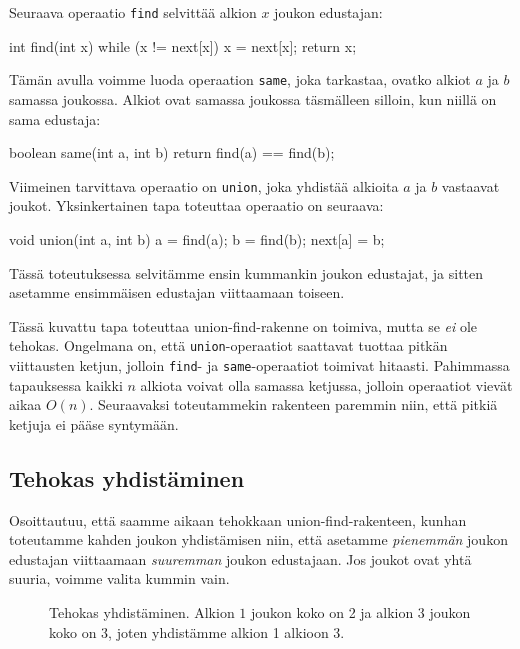 Seuraava operaatio \texttt{find} selvittää alkion $x$ joukon edustajan:

\begin{code}
int find(int x) {
    while (x != next[x]) {
        x = next[x];
    }
    return x;
}
\end{code}

Tämän avulla voimme luoda operaation \texttt{same}, joka tarkastaa,
ovatko alkiot $a$ ja $b$ samassa joukossa.
Alkiot ovat samassa joukossa täsmälleen silloin, kun niillä
on sama edustaja:

\begin{code}
boolean same(int a, int b) {
    return find(a) == find(b);
}
\end{code}

Viimeinen tarvittava operaatio on \texttt{union}, joka yhdistää alkioita
$a$ ja $b$ vastaavat joukot.
Yksinkertainen tapa toteuttaa operaatio on seuraava:

\begin{code}
void union(int a, int b) {
    a = find(a);
    b = find(b);
    next[a] = b;
}
\end{code}

Tässä toteutuksessa selvitämme ensin kummankin joukon edustajat,
ja sitten asetamme ensimmäisen edustajan viittaamaan toiseen.

Tässä kuvattu tapa toteuttaa union-find-rakenne on toimiva,
mutta se \emph{ei} ole tehokas.
Ongelmana on, että \texttt{union}-operaatiot saattavat tuottaa
pitkän viittausten ketjun, jolloin \texttt{find}- ja
\texttt{same}-operaatiot toimivat hitaasti.
Pahimmassa tapauksessa kaikki $n$ alkiota voivat olla
samassa ketjussa, jolloin operaatiot vievät aikaa $O(n)$.
Seuraavaksi toteutammekin rakenteen paremmin niin,
että pitkiä ketjuja ei pääse syntymään.

\subsection{Tehokas yhdistäminen}

Osoittautuu, että saamme aikaan tehokkaan union-find-rakenteen,
kunhan toteutamme kahden joukon yhdistämisen niin,
että asetamme \emph{pienemmän} joukon edustajan viittaamaan
\emph{suuremman} joukon edustajaan. Jos joukot ovat yhtä suuria,
voimme valita kummin vain.

\begin{figure}
\center
\begin{center}
\end{center}
\caption{Tehokas yhdistäminen. Alkion $1$ joukon koko on 2
ja alkion $3$ joukon koko on 3,
joten yhdistämme alkion 1 alkioon 3.}
\label{fig:tehyhd}
\end{figure}


